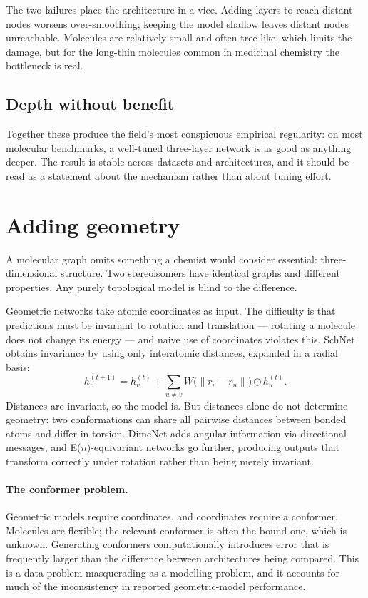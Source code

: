 \documentclass[11pt,a4paper]{article}
\begin{document}
The two failures place the architecture in a vice. Adding layers to reach
distant nodes worsens over-smoothing; keeping the model shallow leaves distant
nodes unreachable. Molecules are relatively small and often tree-like, which
limits the damage, but for the long-thin molecules common in medicinal
chemistry the bottleneck is real.

\subsection{Depth without benefit}

Together these produce the field's most conspicuous empirical regularity: on
most molecular benchmarks, a well-tuned three-layer network is as good as
anything deeper. The result is stable across datasets and architectures, and
it should be read as a statement about the mechanism rather than about tuning
effort.

\section{Adding geometry}
\label{sec:geometry}

A molecular graph omits something a chemist would consider essential:
three-dimensional structure. Two stereoisomers have identical graphs and
different properties. Any purely topological model is blind to the difference.

Geometric networks take atomic coordinates as input. The difficulty is that
predictions must be invariant to rotation and translation --- rotating a
molecule does not change its energy --- and naive use of coordinates violates
this. SchNet \cite{schutt2017} obtains invariance by using only interatomic
distances, expanded in a radial basis:
\begin{equation}
  h_v^{(t+1)} = h_v^{(t)} + \sum_{u \ne v}
    W\big(\| r_v - r_u \|\big) \odot h_u^{(t)}.
\end{equation}
Distances are invariant, so the model is. But distances alone do not determine
geometry: two conformations can share all pairwise distances between bonded
atoms and differ in torsion. DimeNet \cite{gasteiger2020} adds angular
information via directional messages, and E($n$)-equivariant networks
\cite{satorras2021} go further, producing outputs that transform correctly
under rotation rather than being merely invariant.

\paragraph{The conformer problem.}
Geometric models require coordinates, and coordinates require a conformer.
Molecules are flexible; the relevant conformer is often the bound one, which
is unknown. Generating conformers computationally introduces error that is
frequently larger than the difference between architectures being compared.
This is a data problem masquerading as a modelling problem, and it accounts
for much of the inconsistency in reported geometric-model performance.
\end{document}

